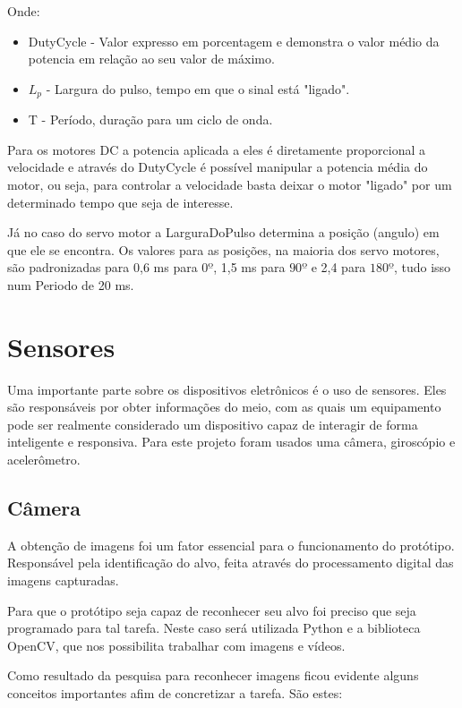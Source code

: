 Onde:

\begin{itemize}
\item DutyCycle - Valor expresso em porcentagem e demonstra o valor médio da potencia em relação ao seu valor de máximo.
\item $L_p$ - Largura do pulso, tempo em que o sinal está "ligado".
\item T - Período, duração para um ciclo de onda.
\end{itemize}

Para os motores DC a potencia aplicada a eles é diretamente proporcional a velocidade e através do DutyCycle é possível manipular a potencia média do motor, ou seja, para controlar a velocidade basta deixar o motor "ligado" por um determinado tempo que seja de interesse.

Já no caso do servo motor a LarguraDoPulso determina a posição (angulo) em que ele se encontra. Os valores para as posições, na maioria dos servo motores, são padronizadas para 0,6 ms para $0º$, 1,5 ms para $90º$ e 2,4 para $180º$, tudo isso num Periodo de 20 ms.

\section{Sensores}

Uma importante parte sobre os dispositivos eletrônicos é o uso de sensores. Eles são responsáveis por obter informações do meio, com as quais um equipamento pode ser realmente considerado um dispositivo capaz de interagir de forma inteligente e responsiva. Para este projeto foram usados uma câmera, giroscópio e acelerômetro.

\subsection{Câmera}

A obtenção de imagens foi um fator essencial para o funcionamento do protótipo. Responsável pela identificação do alvo, feita através do processamento digital das imagens capturadas.

Para que o protótipo seja capaz de reconhecer seu alvo foi preciso que seja programado para tal tarefa. Neste caso será utilizada Python e a biblioteca OpenCV, que nos possibilita trabalhar com imagens e vídeos.

Como resultado da pesquisa para reconhecer imagens ficou evidente alguns conceitos importantes afim de concretizar a tarefa. São estes:

